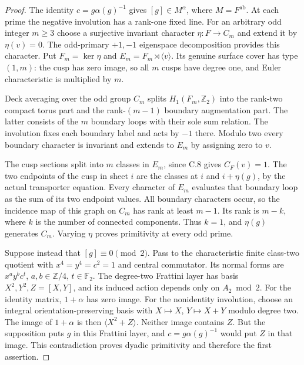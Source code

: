 \begin{proof}
The identity $c=g\alpha(g)^{-1}$ gives
$[g]\in M^\alpha$, where $M=F^{\mathrm{ab}}$.
At each prime the negative involution has a
rank-one fixed line.  For an arbitrary odd integer
$m\geq3$ choose a surjective invariant character
$\eta:F\to C_m$ and extend it by $\eta(v)=0$.
The odd-primary $+1,-1$ eigenspace decomposition
provides this character.  Put $F_m=\ker\eta$ and
$E_m=F_m\rtimes\langle v\rangle$.  Its genuine
surface cover has type $(1,m)$: the cusp has
zero image, so all $m$ cusps have degree one,
and Euler characteristic is multiplied by $m$.

Deck averaging over the odd group $C_m$ splits
$H_1(F_m,\mathbb Z_2)$ into the rank-two compact
torus part and the rank-$(m-1)$ boundary
augmentation part.  The latter consists of the
$m$ boundary loops with their sole sum relation.
The involution fixes each boundary label and
acts by $-1$ there.  Modulo two every boundary
character is invariant and extends to $E_m$ by
assigning zero to $v$.

The cusp sections split into $m$ classes in
$E_m$, since C.8 gives $C_F(v)=1$.
The two endpoints of the cusp in sheet $i$
are the classes at $i$ and $i+\eta(g)$, by
the actual transporter equation.  Every
character of $E_m$ evaluates that boundary
loop as the sum of its two endpoint values.
All boundary characters occur, so the
incidence map of this graph on $C_m$ has rank
at least $m-1$.  Its rank is $m-k$, where $k$
is the number of connected components.  Thus
$k=1$, and $\eta(g)$ generates $C_m$.
Varying $\eta$ proves primitivity at every
odd prime.

Suppose instead that $[g]\equiv0\pmod2$.
Pass to the characteristic finite class-two
quotient with $x^4=y^4=c^2=1$ and central
commutator.  Its normal forms are
$x^a y^b c^t$, $a,b\in\mathbb Z/4$, $t\in\mathbb F_2$.
The degree-two Frattini layer has basis
$X^2,Y^2,Z=[X,Y]$, and its induced action
depends only on $A_2\bmod2$.  For the
identity matrix, $1+\alpha$ has zero image.
For the nonidentity involution, choose an
integral orientation-preserving basis with
$X\mapsto X$, $Y\mapsto X+Y$ modulo degree
two.  The image of $1+\alpha$ is then
$\langle X^2+Z\rangle$.  Neither image
contains $Z$.  But the supposition puts
$g$ in this Frattini layer, and
$c=g\alpha(g)^{-1}$ would put $Z$ in that
image.  This contradiction proves dyadic
primitivity and therefore the first assertion.


\end{proof}

